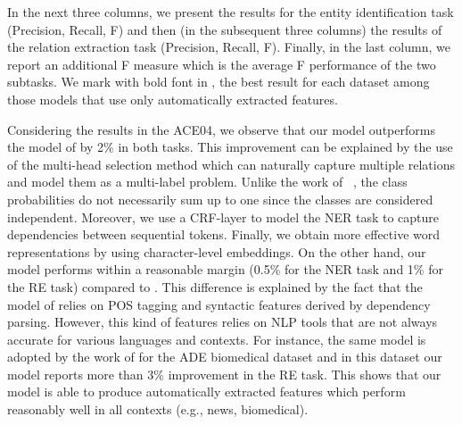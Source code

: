 \documentclass[review]{elsarticle}
\newcommand{\eg}{e.g., }
\begin{document}
In the next three columns, we present the results for the entity identification task (Precision, Recall, F) and then (in the subsequent three columns) the results of the relation extraction task (Precision, Recall, F). Finally, in the last column, we report an additional F measure which is the average F performance of the two subtasks. We mark with bold font in , the best result for each dataset among those models that use only automatically extracted features.

Considering the results in the ACE04, we observe that our model outperforms the model of \cite{katiyar:17} by 2\% in both tasks. This improvement can be explained by the use of the multi-head selection method which can naturally capture multiple relations and model them as a multi-label problem. Unlike the work of ~\cite{katiyar:17}, the class probabilities do not necessarily sum up to one since the classes are considered independent. Moreover, we use a CRF-layer to model the NER task to capture dependencies between sequential tokens. Finally, we obtain more effective word representations by using character-level embeddings. On the other hand, our model performs within a reasonable margin (0.5\% for the NER task and 1\% for the RE task) compared to \cite{miwa:16}. This difference is explained by the fact that the model of \cite{miwa:16} relies on POS tagging and syntactic features derived by dependency parsing. However, this kind of features relies on NLP tools that are not always accurate for various languages and contexts. For instance, the same model is adopted by the work of \cite{li:17} for the ADE biomedical dataset and in this dataset our model reports more than 3\% improvement in the RE task. This shows that our model is able to produce automatically extracted features which perform reasonably well in all contexts (\eg news, biomedical).
\end{document}
